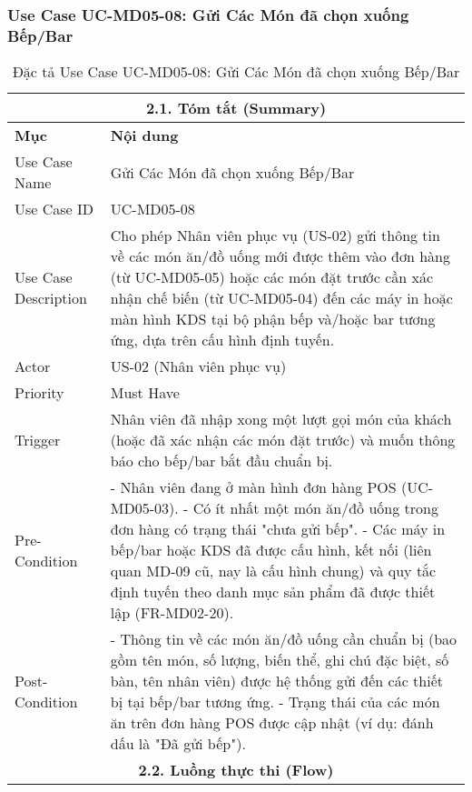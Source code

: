 \subsubsection{Use Case UC-MD05-08: Gửi Các Món đã chọn xuống Bếp/Bar}
\begin{longtable}{|m{4cm}|p{11cm}|}
\caption{Đặc tả Use Case UC-MD05-08: Gửi Các Món đã chọn xuống Bếp/Bar} \label{tab:uc_md05_08_final} \\
\hline
\multicolumn{2}{|c|}{\textbf{2.1. Tóm tắt (Summary)}} \\
\hline
\textbf{Mục} & \textbf{Nội dung} \\
\hline
\endhead %
\hline
\endfoot %
\hline
\endlastfoot %
Use Case Name & Gửi Các Món đã chọn xuống Bếp/Bar \\
\hline
Use Case ID & UC-MD05-08 \\
\hline
Use Case Description & Cho phép Nhân viên phục vụ (US-02) gửi thông tin về các món ăn/đồ uống mới được thêm vào đơn hàng (từ UC-MD05-05) hoặc các món đặt trước cần xác nhận chế biến (từ UC-MD05-04) đến các máy in hoặc màn hình KDS tại bộ phận bếp và/hoặc bar tương ứng, dựa trên cấu hình định tuyến. \\
\hline
Actor & US-02 (Nhân viên phục vụ) \\
\hline
Priority & Must Have \\
\hline
Trigger & Nhân viên đã nhập xong một lượt gọi món của khách (hoặc đã xác nhận các món đặt trước) và muốn thông báo cho bếp/bar bắt đầu chuẩn bị. \\
\hline
Pre-Condition & - Nhân viên đang ở màn hình đơn hàng POS (UC-MD05-03). \newline - Có ít nhất một món ăn/đồ uống trong đơn hàng có trạng thái "chưa gửi bếp". \newline - Các máy in bếp/bar hoặc KDS đã được cấu hình, kết nối (liên quan MD-09 cũ, nay là cấu hình chung) và quy tắc định tuyến theo danh mục sản phẩm đã được thiết lập (FR-MD02-20). \\
\hline
Post-Condition & - Thông tin về các món ăn/đồ uống cần chuẩn bị (bao gồm tên món, số lượng, biến thể, ghi chú đặc biệt, số bàn, tên nhân viên) được hệ thống gửi đến các thiết bị tại bếp/bar tương ứng. \newline - Trạng thái của các món ăn trên đơn hàng POS được cập nhật (ví dụ: đánh dấu là "Đã gửi bếp"). \\
\hline
\multicolumn{2}{|c|}{\textbf{2.2. Luồng thực thi (Flow)}} \\

\end{longtable}

